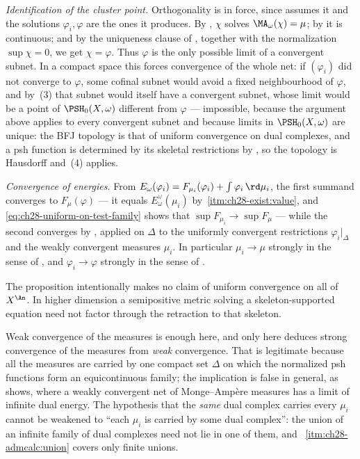 \emph{Identification of the cluster point.}  Orthogonality is in force,
since  assumes it and the solutions
$\varphi_i,\varphi$ are the ones it produces.  By
, $\chi$ solves
$\MA_\omega(\chi)=\mu$; by  it is
continuous; and by the uniqueness clause of
, together with the normalization
$\sup\chi=0$, we get $\chi=\varphi$.  Thus $\varphi$ is the only
possible limit of a convergent subnet.  In a compact space this forces
convergence of the whole net: if $(\varphi_i)$ did not converge to
$\varphi$, some cofinal subnet would avoid a fixed neighbourhood of
$\varphi$, and by \,(3) that subnet would itself
have a convergent subnet, whose limit would be a point of
$\PSH_0(X,\omega)$ different from $\varphi$ --- impossible, because the
argument above applies to every convergent subnet and because limits in
$\PSH_0(X,\omega)$ are unique: the BFJ topology is that of uniform
convergence on dual complexes, and a psh function is determined by its
skeletal restrictions by , so the
topology is Hausdorff and \,(4) applies.

\emph{Convergence of energies.}  From
$E_\omega(\varphi_i)=F_{\mu_i}(\varphi_i)+\int\varphi_i\,\rd\mu_i$, the
first summand converges to $F_\mu(\varphi)$ --- it equals
$E^\vee_\omega(\mu_i)$ by
\,\cref{itm:ch28-exist:value}, and
\eqref{eq:ch28-uniform-on-test-family} shows that
$\sup F_{\mu_i}\to\sup F_\mu$ --- while the second converges by
, applied on $\Delta$ to the uniformly
convergent restrictions $\varphi_i|_\Delta$ and the weakly convergent
measures $\mu_i$.  In particular $\mu_i\to\mu$ strongly in the sense of
, and
$\varphi_i\to\varphi$ strongly in the sense of .

The proposition intentionally makes no claim of uniform convergence on all
of $X^{\An}$.  In higher dimension a semipositive metric solving a
skeleton-supported equation need not factor through the retraction to that
skeleton.

\begin{warning}{Weak convergence of the measures is enough here, and only
here}
 deduces strong convergence of the
measures from \emph{weak} convergence.  That is legitimate because all the
measures are carried by one compact set $\Delta$ on which the normalized
psh functions form an equicontinuous family; the implication is false in
general, as  shows, where a weakly
convergent net of Monge--Amp\`ere measures has a limit of infinite dual
energy.  The hypothesis that the \emph{same} dual complex carries every
$\mu_i$ cannot be weakened to ``each $\mu_i$ is carried by some dual
complex'': the union of an infinite family of dual complexes need not lie in
one of them, and \,%
\cref{itm:ch28-admcalc:union} covers only finite unions.
\end{warning}

